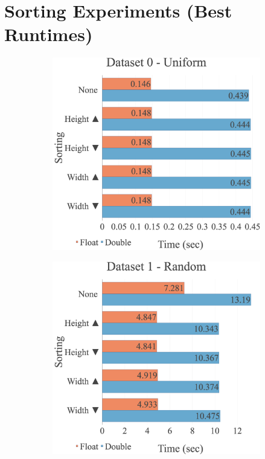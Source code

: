 \section{Sorting Experiments (Best Runtimes)}
\label{appendix:experiments:cudamulti:sorting}
\begin{figure}[H]
\begin{adjustwidth}{-2cm}{-2cm}
\centering
\begin{subfigure}{.62\textwidth}
    \centering
    \includegraphics[width=1\textwidth]{img/experiments/multi-sorts-0_UNIFORM.png}
\end{subfigure}
\begin{subfigure}{.62\textwidth}
    \centering
    \includegraphics[width=1\textwidth]{img/experiments/multi-sorts-1_RAND.png}

\end{subfigure}
\end{adjustwidth}
\end{figure}
